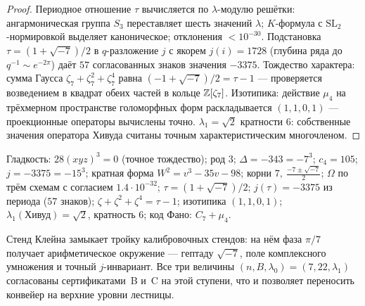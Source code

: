 \begin{proof}
Периодное отношение $\tau$ вычисляется по $\lambda$-модулю решётки:
ангармоническая группа $S_3$ переставляет шесть значений $\lambda$;
$K$-формула с $\mathrm{SL}_2$-нормировкой выделяет каноническое;
отклонения $<10^{-30}$. Подстановка $\tau=(1+\sqrt{-7})/2$ в
$q$-разложение $j$ с якорем $j(i)=1728$ (глубина ряда до
$q^{-1}\sim e^{-2\pi}$) даёт $57$ согласованных знаков значения
$-3375$. Тождество характера: сумма Гаусса $\zeta_7+\zeta_7^2+
\zeta_7^4$ равна $(-1+\sqrt{-7})/2=\tau-1$ — проверяется возведением
в квадрат обеих частей в кольце $\mathbb{Z}[\zeta_7]$. Изотипика: действие
$\mu_4$ на трёхмерном пространстве голоморфных форм раскладывается
$(1,1,0,1)$ — проекционные операторы вычислены точно.
$\lambda_1=\sqrt2$ кратности $6$: собственные значения оператора
Хивуда считаны точным характеристическим многочленом.
\end{proof}

\begin{databox}
Гладкость: $28(xyz)^3=0$ (точное тождество); род $3$;
$\Delta=-343=-7^3$; $c_4=105$; $j=-3375=-15^3$; кратная форма
$W^2=v^3-35v-98$; корни $7,\ \tfrac{-7\pm\sqrt{-7}}2$;
$\Omega$ по трём схемам с согласием $1.4\cdot10^{-32}$;
$\tau=(1+\sqrt{-7})/2$; $j(\tau)=-3375$ из периода ($57$ знаков);
$\zeta+\zeta^2+\zeta^4=\tau-1$; изотипика $(1,1,0,1)$;
$\lambda_1(\text{Хивуд})=\sqrt2$, кратность $6$;
код Фано: $C_7+\mu_4$.
\end{databox}

Стенд Клейна замыкает тройку калибровочных стендов: на нём фаза
$\pi/7$ получает арифметическое окружение — гептаду $\sqrt{-7}$,
поле комплексного умножения и точный $j$-инвариант. Все три величины
$(n,B,\lambda_0)=(7,22,\lambda_1)$ согласованы сертификатами~B и~C
на этой ступени, что и позволяет переносить конвейер на верхние
уровни лестницы.
